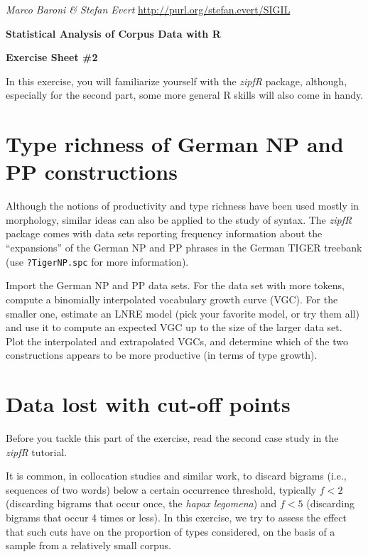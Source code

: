 \documentclass[a4paper,12pt]{article}
\begin{document}
\emph{Marco Baroni \& Stefan Evert} \hfill %
{\small \url{http://purl.org/stefan.evert/SIGIL}}

\begin{center}
  \textbf{\Large Statistical Analysis of Corpus Data with R}

  \textbf{\large Exercise Sheet \#2}
\end{center}

In this exercise, you will familiarize yourself with the \emph{zipfR}
package, although, especially for the second part, some more general R
skills will also come in handy.  

\section{Type richness of German NP and PP constructions}

Although the notions of productivity and type richness have been used mostly
in morphology, similar ideas can also be applied to the study of syntax.  The
\emph{zipfR} package comes with data sets reporting frequency information
about the ``expansions'' of the German NP and PP phrases in the German TIGER
treebank (use \texttt{?TigerNP.spc} for more information).

Import the German NP and PP data sets. For the data set with more tokens,
compute a binomially interpolated vocabulary growth curve (VGC).  For the
smaller one, estimate an LNRE model (pick your favorite model, or try them
all) and use it to compute an expected VGC up to the size of the larger data
set.  Plot the interpolated and extrapolated VGCs, and determine which of the
two constructions appears to be more productive (in terms of type growth).


\section{Data lost with cut-off points}

Before you tackle this part of the exercise, read the second case study in
the \emph{zipfR} tutorial.

It is common, in collocation studies and similar work, to discard bigrams
(i.e., sequences of two words) below a certain occurrence threshold, typically
$f < 2$ (discarding bigrams that occur once, the \emph{hapax legomena}) and $f
< 5$ (discarding bigrams that occur 4 times or less).  In this exercise, we
try to assess the effect that such cuts have on the proportion of types
considered, on the basis of a sample from a relatively small corpus.
\end{document}
